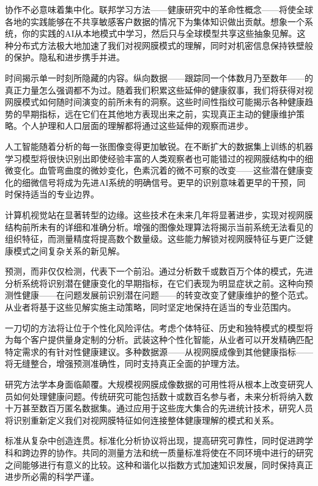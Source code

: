 \documentclass[
  Letterpaper,
]{scrbook}
\begin{document}
协作不必意味着集中化。联邦学习方法------健康研究中的革命性概念------将使全球各地的实践能够在不共享敏感客户数据的情况下为集体知识做出贡献。想象一个系统，你的实践的AI从本地模式中学习，然后只与全球模型共享这些抽象见解。这种分布式方法极大地加速了我们对视网膜模式的理解，同时对机密信息保持铁壁般的保护。隐私和进步携手并进。

时间揭示单一时刻所隐藏的内容。纵向数据------跟踪同一个体数月乃至数年------的真正力量怎么强调都不为过。随着我们积累这些延伸的健康叙事，我们将获得对视网膜模式如何随时间演变的前所未有的洞察。这些时间性指纹可能揭示各种健康趋势的早期指标，远在它们在其他地方表现出来之前，实现真正主动的健康维护策略。个人护理和人口层面的理解都将通过这些延伸的观察而进步。

人工智能随着分析的每一张图像变得更加敏锐。在不断扩大的数据集上训练的机器学习模型将很快识别出即使经验丰富的人类观察者也可能错过的视网膜结构中的细微变化。血管弯曲度的微妙变化，色素沉着的微不可察的改变------这些潜在健康变化的细微信号将成为先进AI系统的明确信号。更早的识别意味着更早的干预，同时保持适当的专业边界。

计算机视觉站在显著转型的边缘。这些技术在未来几年将显著进步，实现对视网膜结构前所未有的详细和准确分析。增强的图像处理算法将揭示当前系统无法看见的组织特征，而测量精度将提高数个数量级。这些能力解锁对视网膜特征与更广泛健康模式之间复杂关系的新见解。

预测，而非仅仅检测，代表下一个前沿。通过分析数千或数百万个体的模式，先进分析系统将识别潜在健康变化的早期指标，在它们表现为明显症状之前。这种向预测性健康------在问题发展前识别潜在问题------的转变改变了健康维护的整个范式。从业者将基于这些见解实施主动策略，同时坚定地保持在适当的专业范围内。

一刀切的方法将让位于个性化风险评估。考虑个体特征、历史和独特模式的模型将为每个客户提供量身定制的分析。武装这种个性化智能，从业者可以开发精确匹配特定需求的有针对性健康建议。多种数据源------从视网膜成像到其他健康指标------将无缝整合，增强预测准确性，同时支持真正全面的护理方法。

研究方法学本身面临颠覆。大规模视网膜成像数据的可用性将从根本上改变研究人员如何处理健康问题。传统研究可能包括数十或数百名参与者，未来分析将纳入数十万甚至数百万匿名数据集。通过应用于这些庞大集合的先进统计技术，研究人员将识别重新定义我们对视网膜特征如何连接整体健康理解的模式和关系。

标准从复杂中创造连贯。标准化分析协议将出现，提高研究可靠性，同时促进跨学科和跨边界的协作。共同的测量方法和统一质量标准将使在不同环境中进行的研究之间能够进行有意义的比较。这种和谐化以指数方式加速知识发展，同时保持真正进步所必需的科学严谨。
\end{document}

